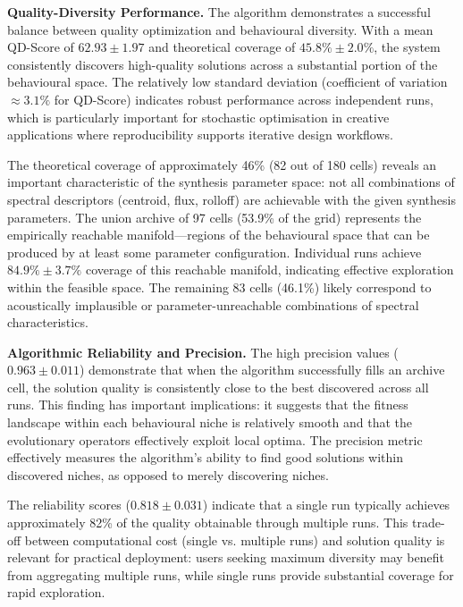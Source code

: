 \textbf{Quality-Diversity Performance.}
The algorithm demonstrates a successful balance between quality optimization and behavioural diversity. With a mean QD-Score of $62.93 \pm 1.97$ and theoretical coverage of $45.8\% \pm 2.0\%$, the system consistently discovers high-quality solutions across a substantial portion of the behavioural space. The relatively low standard deviation (coefficient of variation $\approx 3.1\%$ for QD-Score) indicates robust performance across independent runs, which is particularly important for stochastic optimisation in creative applications where reproducibility supports iterative design workflows.

The theoretical coverage of approximately 46\% (82 out of 180 cells) reveals an important characteristic of the synthesis parameter space: not all combinations of spectral descriptors (centroid, flux, rolloff) are achievable with the given synthesis parameters. The union archive of 97 cells (53.9\% of the grid) represents the empirically reachable manifold—regions of the behavioural space that can be produced by at least some parameter configuration. Individual runs achieve $84.9\% \pm 3.7\%$ coverage of this reachable manifold, indicating effective exploration within the feasible space. The remaining 83 cells (46.1\%) likely correspond to acoustically implausible or parameter-unreachable combinations of spectral characteristics.

\textbf{Algorithmic Reliability and Precision.}
The high precision values ($0.963 \pm 0.011$) demonstrate that when the algorithm successfully fills an archive cell, the solution quality is consistently close to the best discovered across all runs. This finding has important implications: it suggests that the fitness landscape within each behavioural niche is relatively smooth and that the evolutionary operators effectively exploit local optima. The precision metric effectively measures the algorithm's ability to find good solutions within discovered niches, as opposed to merely discovering niches.

The reliability scores ($0.818 \pm 0.031$) indicate that a single run typically achieves approximately 82\% of the quality obtainable through multiple runs. This trade-off between computational cost (single vs. multiple runs) and solution quality is relevant for practical deployment: users seeking maximum diversity may benefit from aggregating multiple runs, while single runs provide substantial coverage for rapid exploration.

